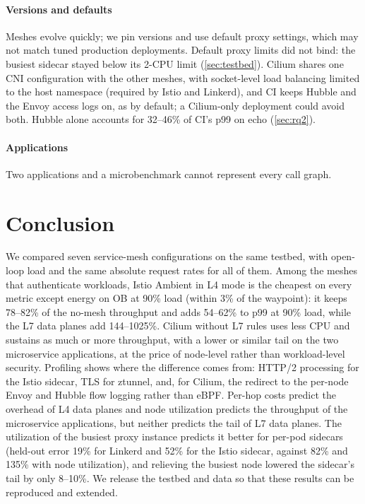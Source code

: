 \paragraph{Versions and defaults}
Meshes evolve quickly; we pin versions and use default proxy settings, which
may not match tuned production deployments. Default proxy limits did not bind:
the busiest sidecar stayed below its 2-CPU limit (\cref{sec:testbed}).
Cilium shares one CNI configuration with the other meshes, with socket-level
load balancing limited to the host namespace (required by Istio and Linkerd),
and CI keeps Hubble and the Envoy access logs on, as by default; a Cilium-only
deployment could avoid both. Hubble alone accounts for 32--46\% of CI's p99 on
echo (\cref{sec:rq2}).

\paragraph{Applications}
Two applications and a microbenchmark cannot represent every call graph.

\section{Conclusion}
\label{sec:conclusion}

We compared seven service-mesh configurations on the same testbed, with open-loop
load and the same absolute request rates for all of them. Among the meshes that
authenticate workloads, Istio Ambient in L4 mode is the cheapest on every
metric except energy on OB at 90\% load (within 3\% of the waypoint): it keeps 78--82\% of the no-mesh throughput and adds 54--62\% to p99 at
90\% load, while the L7 data planes add 144--1025\%. Cilium without L7 rules uses
less CPU and sustains as much or more throughput, with a lower or similar tail on the
two microservice applications, at the price of node-level rather than
workload-level security. Profiling shows where the difference comes
from: HTTP/2 processing for the Istio sidecar, TLS for ztunnel, and, for Cilium,
the redirect to the per-node Envoy and Hubble flow logging rather than eBPF.
Per-hop costs predict the overhead of L4 data planes and node utilization
predicts the throughput of the microservice applications, but neither predicts
the tail of L7 data planes. The utilization of the busiest proxy instance
predicts it better for per-pod sidecars (held-out error 19\% for Linkerd and
52\% for the Istio sidecar, against 82\% and 135\% with node utilization), and
relieving the busiest node lowered the sidecar's tail by only 8--10\%. We release the testbed and
data so that these results can be reproduced and extended.
